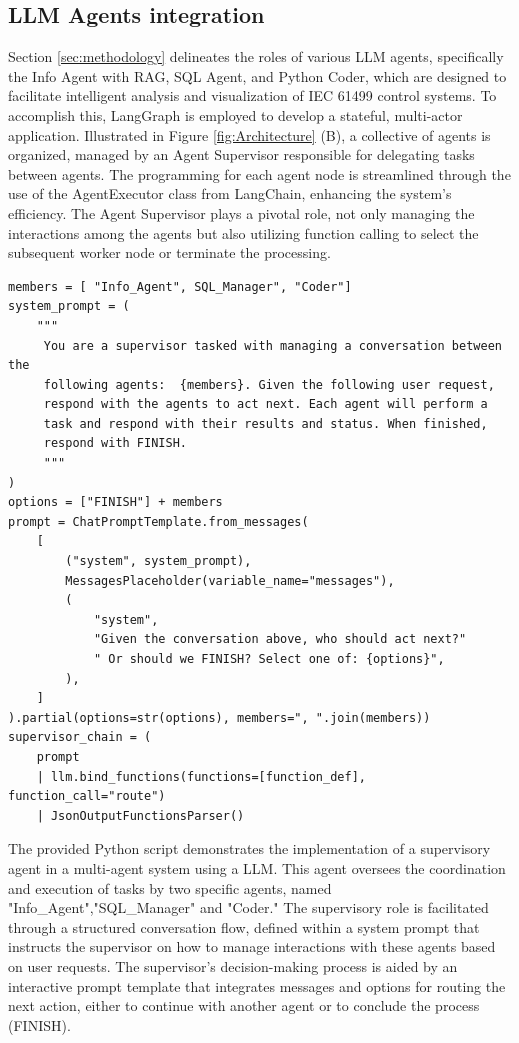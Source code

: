 \begin{bibunit}
\subsection{LLM Agents integration}


Section \ref{sec:methodology} delineates the roles of various LLM agents, specifically the Info Agent with RAG, SQL Agent, and Python Coder, which are designed to facilitate intelligent analysis and visualization of IEC 61499 control systems. To accomplish this, LangGraph is employed to develop a stateful, multi-actor application. Illustrated in Figure \ref{fig:Architecture} (B), a collective of agents is organized, managed by an Agent Supervisor responsible for delegating tasks between agents. The programming for each agent node is streamlined through the use of the AgentExecutor class from LangChain, enhancing the system's efficiency.  The Agent Supervisor plays a pivotal role, not only managing the interactions among the agents but also utilizing function calling to select the subsequent worker node or terminate the processing. 

\begin{lstlisting} 
members = [ "Info_Agent", SQL_Manager", "Coder"]
system_prompt = (
    """
     You are a supervisor tasked with managing a conversation between the
     following agents:  {members}. Given the following user request,
     respond with the agents to act next. Each agent will perform a
     task and respond with their results and status. When finished,
     respond with FINISH.
     """
)
options = ["FINISH"] + members
prompt = ChatPromptTemplate.from_messages(
    [
        ("system", system_prompt),
        MessagesPlaceholder(variable_name="messages"),
        (
            "system",
            "Given the conversation above, who should act next?"
            " Or should we FINISH? Select one of: {options}",
        ),
    ]
).partial(options=str(options), members=", ".join(members))
supervisor_chain = (
    prompt
    | llm.bind_functions(functions=[function_def], function_call="route")
    | JsonOutputFunctionsParser()
\end{lstlisting}

The provided Python script demonstrates the implementation of a supervisory agent in a multi-agent system using a LLM. This agent oversees the coordination and execution of tasks by two specific agents, named "Info\_Agent","SQL\_Manager" and "Coder." The supervisory role is facilitated through a structured conversation flow, defined within a system prompt that instructs the supervisor on how to manage interactions with these agents based on user requests. The supervisor's decision-making process is aided by an interactive prompt template that integrates messages and options for routing the next action, either to continue with another agent or to conclude the process (FINISH).


\end{bibunit}
